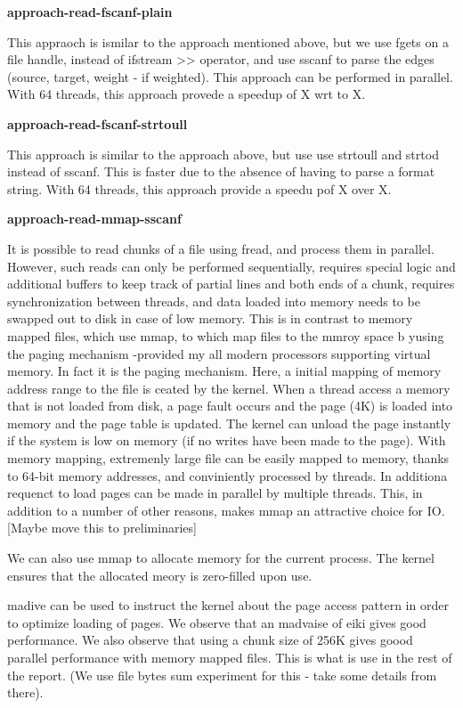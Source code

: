 \textbf{approach-read-fscanf-plain}

This appraoch is ismilar to the approach mentioned above, but we use fgets on a file handle, instead of ifstream >> operator, and use sscanf to parse the edges (source, target, weight - if weighted). This approach can be performed in parallel. With 64 threads, this approach provede a speedup of X wrt to X.

\textbf{approach-read-fscanf-strtoull}

This approach is similar to the approach above, but use use strtoull and strtod instead of sscanf. This is faster due to the absence of having to parse a format string. With 64 threads, this approach provide a speedu pof X over X.

\textbf{approach-read-mmap-sscanf}

It is possible to read chunks of a file using fread, and process them in parallel. However, such reads can only be performed sequentially, requires special logic and additional buffers to keep track of partial lines and both ends of a chunk, requires synchronization between threads, and data loaded into memory needs to be swapped out to disk in case of low memory. This is in contrast to memory mapped files, which use mmap, to which map files to the mmroy space b yusing the paging mechanism  -provided my all modern processors supporting virtual memory. In fact it is the paging mechanism. Here, a initial mapping of memory address range to the file is ceated by the kernel. When a thread access a memory that is not loaded from disk, a page fault occurs and the page (4K) is loaded into memory and the page table is updated. The kernel can unload the page instantly if the system is low on memory (if no writes have been made to the page). With memory mapping, extremenly large file can be easily mapped to memory, thanks to 64-bit memory addresses, and conviniently processed by threads. In additiona requenct to load pages can be made in parallel by multiple threads. This, in addition to a number of other reasons, makes mmap an attractive choice for IO.
[Maybe move this to preliminaries]

We can also use mmap to allocate memory for the current process. The kernel ensures that the allocated meory is zero-filled upon use.

madive can be used to instruct the kernel about the page access pattern in order to optimize loading of pages. We observe that an madvaise of eiki gives good performance. We also observe that using a chunk size of 256K gives goood parallel performance with memory mapped files. This is what is use in the rest of the report.
(We use file bytes sum experiment for this - take some details from there).

